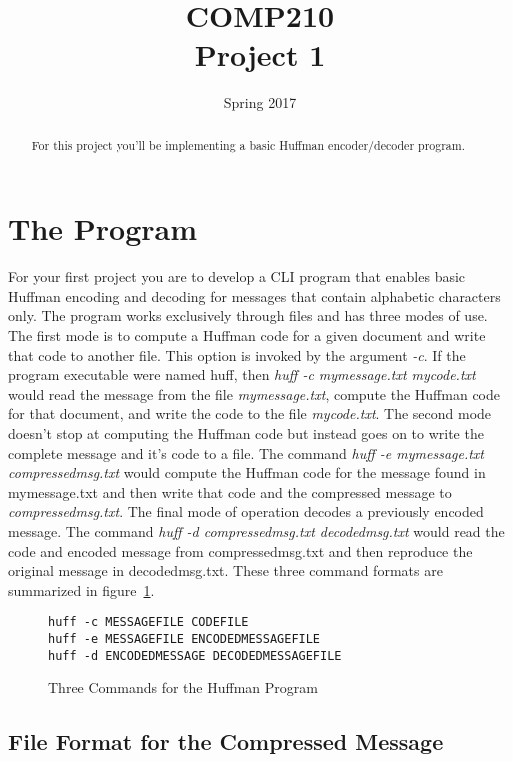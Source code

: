 \documentclass[nobib]{tufte-handout}
\title{COMP210 \\ Project 1}
\author{}
\date{Spring 2017}
\begin{document}
\maketitle

\begin{abstract}
For this project you'll be implementing a basic Huffman encoder/decoder program.
\end{abstract}

\section{The Program}

For your first project you are to develop a CLI program that enables basic Huffman encoding and decoding for messages that contain alphabetic characters only. The program works exclusively through files and has three modes of use.  The first mode is to compute a Huffman code for a given document and write that code to another file. This option is invoked by the argument \textit{-c}. If the program executable were named huff, then \textit{huff -c mymessage.txt mycode.txt} would read the message from the file \textit{mymessage.txt}, compute the Huffman code for that document, and write the code to the file \textit{mycode.txt}. The second mode doesn't stop at computing the Huffman code but instead goes on to write the complete message and it's code to a file. The command \textit{huff -e mymessage.txt compressedmsg.txt} would compute the Huffman code for the message found in mymessage.txt and then write that code and the compressed message to \textit{compressedmsg.txt}. The final mode of operation decodes a previously encoded message. The command \textit{huff -d compressedmsg.txt decodedmsg.txt} would read the code and encoded message from compressedmsg.txt and then reproduce the original message in decodedmsg.txt. These three command formats are summarized in figure~\ref{fig:cmds}.
\begin{figure}
\begin{verbatim}
huff -c MESSAGEFILE CODEFILE
huff -e MESSAGEFILE ENCODEDMESSAGEFILE
huff -d ENCODEDMESSAGE DECODEDMESSAGEFILE
\end{verbatim}
\caption{Three Commands for the Huffman Program}
\label{fig:cmds}
\end{figure}

\subsection{File Format for the Compressed Message}
\end{document}
